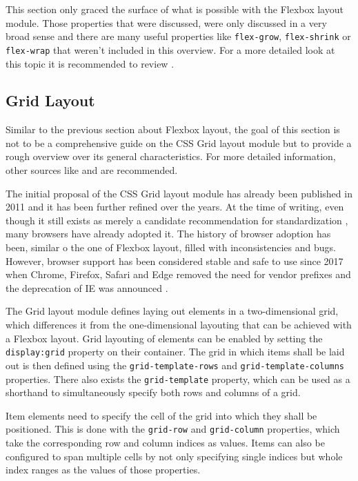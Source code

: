 This section only graced the surface of what is possible with the Flexbox layout module. Those properties that were discussed, were only discussed in a very broad sense and there are many useful properties like \lstinline{flex-grow}, \lstinline{flex-shrink} or \lstinline{flex-wrap} that weren't included in this overview. For a more detailed look at this topic it is recommended to review \cite{CSSFlexbox}.

\subsection{Grid Layout}
\label{sec:Grid}

Similar to the previous section about Flexbox layout, the goal of this section is not to be a comprehensive guide on the CSS Grid layout module but to provide a rough overview over its general characteristics. For more detailed information, other sources like \cite{GridLayoutInCSS} and \cite{CSSGrid} are recommended.

The initial proposal of the CSS Grid layout module has already been published in 2011 \parencite{CSSGridFirstDraft} and it has been further refined over the years. At the time of writing, even though it still exists as merely a candidate recommendation for standardization \parencite{CSSGrid}, many browsers have already adopted it. The history of browser adoption has been, similar o the one of Flexbox layout, filled with inconsistencies and bugs. However, browser support has been considered stable and safe to use since 2017 when Chrome, Firefox, Safari and Edge removed the need for vendor prefixes and the deprecation of IE was announced \parencite{CanIUseCSSGrid}.

The Grid layout module defines laying out elements in a two-dimensional grid, which differences it from the one-dimensional layouting that can be achieved with a Flexbox layout. Grid layouting of elements can be enabled by setting the \lstinline{display:grid} property on their container. The grid in which items shall be laid out is then defined using the \lstinline{grid-template-rows} and \lstinline{grid-template-columns} properties. There also exists the \lstinline{grid-template} property, which can be used as a shorthand to simultaneously specify both rows and columns of a grid.

Item elements need to specify the cell of the grid into which they shall be positioned. This is done with the \lstinline{grid-row} and \lstinline{grid-column} properties, which take the corresponding row and column indices as values. Items can also be configured to span multiple cells by not only specifying single indices but whole index ranges as the values of those properties.

